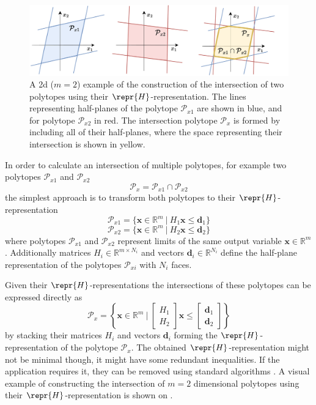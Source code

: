 \begin{figure}[!h]
    \centering
    \includegraphics[width=0.8\linewidth]{Chapters/imgs/polytope_intersection.pdf}
    \caption{A 2d ($m\!=\!2$) example of the construction of the intersection of two polytopes using their $\repr{H}$-representation. The lines representing half-planes of the polytope $\mathcal{P}_{x1}$ are shown in blue, and for polytope $\mathcal{P}_{x2}$ in red. The intersection polytope $\mathcal{P}_x$ is formed by including all of their half-planes, where the space representing their intersection is shown in yellow.}
    \label{fig:collab_intesection_solution}
\end{figure}

In order to calculate an intersection of multiple polytopes, for example two polytopes $\mathcal{P}_{x1}$ and $ \mathcal{P}_{x2}$
\begin{equation}
    \mathcal{P}_x = \mathcal{P}_{x1} \cap \mathcal{P}_{x2}
\end{equation}
the simplest approach is to transform both polytopes to their $\repr{H}$-representation
\begin{equation}
    \mathcal{P}_{x1} = \{\bm{x}\in\mathbb{R}^m ~|~ H_1\bm{x}\leq \bm{d}_1\}
\end{equation}
\begin{equation}
    \mathcal{P}_{x2} = \{\bm{x}\in\mathbb{R}^m ~|~ H_2\bm{x}\leq \bm{d}_2\}
\end{equation}
where polytopes $\mathcal{P}_{x1}$ and  $\mathcal{P}_{x2}$ represent limits of the same output variable $\bm{x}\in\mathbb{R}^m$. Additionally matrices $H_i\in\mathbb{R}^{m\times N_i}$ and vectors $\bm{d}_i\in\mathbb{R}^{N_i}$ define the half-plane representation of the polytopes $\mathcal{P}_{xi}$ with $N_i$ faces.

Given their $\repr{H}$-representations the intersections of these polytopes can be expressed directly as
\begin{equation}
    \mathcal{P}_x = \left\{\bm{x}\in\mathbb{R}^m ~\bigg|~ \begin{bmatrix}
        H_1\\
        H_2
    \end{bmatrix}\bm{x}\leq \begin{bmatrix}
        \bm{d}_1\\
        \bm{d}_2
    \end{bmatrix}\right\}
\end{equation}
by stacking their matrices $H_i$ and vectors $\bm{d}_i$ forming the $\repr{H}$-representation of the polytope $\mathcal{P}_x$. The obtained $\repr{H}$-representation might not be minimal though, it might have some redundant inequalities. If the application requires it, they can be removed using standard algorithms \cite{Paulraj2006}.
A visual example of constructing the intersection of $m=2$ dimensional polytopes using their $\repr{H}$-representation is shown on .

